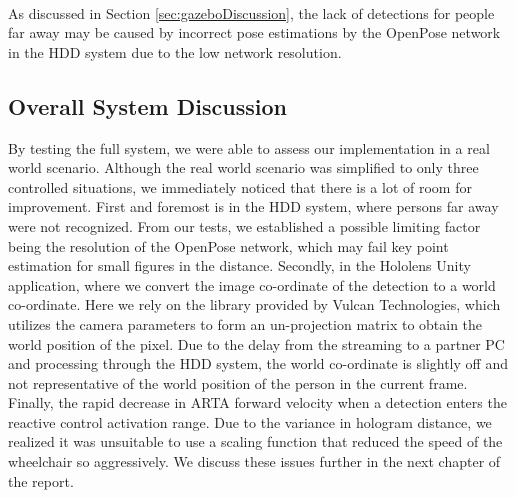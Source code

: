 \paragraph{}As discussed in Section \ref{sec:gazeboDiscussion}, the lack of detections for people far away may be caused by incorrect pose estimations by the OpenPose network in the HDD system due to the low network resolution.

\subsection{Overall System Discussion}
By testing the full system, we were able to assess our implementation in a real world scenario. Although the real world scenario was simplified to only three controlled situations, we immediately noticed that there is a lot of room for improvement. First and foremost is in the HDD system, where persons far away were not recognized. From our tests, we established a possible limiting factor being the resolution of the OpenPose network, which may fail key point estimation for small figures in the distance. Secondly, in the Hololens Unity application, where we convert the image co-ordinate of the detection to a world co-ordinate. Here we rely on the library provided by Vulcan Technologies, which utilizes the camera parameters to form an un-projection matrix to obtain the world position of the pixel. Due to the delay from the streaming to a partner PC and processing through the HDD system, the world co-ordinate is slightly off and not representative of the world position of the person in the current frame. Finally, the rapid decrease in ARTA forward velocity when a detection enters the reactive control activation range. Due to the variance in hologram distance, we realized it was unsuitable to use a scaling function that reduced the speed of the wheelchair so aggressively. We discuss these issues further in the next chapter of the report.
